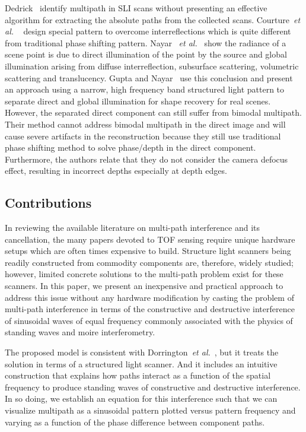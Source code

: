 \documentclass[10pt]{article}
\begin{document}
Dedrick~\cite{dedrick2011improving} identify multipath in SLI scans without presenting an effective algorithm for extracting the absolute paths from the collected scans. Courture~{\it et al.} ~\cite{couture2011unstructured} design special pattern to overcome interreflections which is quite different from traditional phase shifting pattern. Nayar ~{\it et al.}~\cite{nayar2006fast} show the radiance of a scene point is due to direct illumination of the point by the source and global illumination arising from diffuse interreflection, subsurface scattering, volumetric scattering and translucency. Gupta and Nayar~\cite{gupta2012micro} use this conclusion and present an approach using a narrow, high frequency band structured light pattern to separate direct and global illumination for shape recovery for real scenes. However, the separated direct component can still suffer from bimodal multipath. Their method cannot address bimodal multipath in the direct image and will cause severe artifacts in the reconstruction because they still use traditional phase shifting method to solve phase/depth in the direct component. Furthermore, the authors relate that they do not consider the camera defocus effect, resulting in incorrect depths especially at depth edges. 

\subsection{Contributions}
In reviewing the available literature on multi-path interference and its cancellation, the many papers devoted to TOF sensing require unique hardware setups which are often times expensive to build. Structure light scanners being readily constructed from commodity components are, therefore, widely studied; however, limited concrete solutions to the multi-path problem exist for these scanners.  In this paper, we present an inexpensive and practical approach to address this issue without any hardware modification by casting the problem of multi-path interference in terms of the constructive and destructive interference of sinusoidal waves of equal frequency commonly associated with the physics of standing waves and moire interferometry. 

The proposed model is consistent with Dorrington~{\it et al.}~\cite{dorrington2011separating}, but it treats the solution in terms of a structured light scanner.  And it includes an intuitive construction that explains how paths interact as a function of the spatial frequency to produce standing waves of constructive and destructive interference.   In so doing, we establish an equation for this interference such that we can visualize multipath as a sinusoidal pattern plotted versus pattern frequency and varying as a function of the phase difference between component paths.  
\end{document}
